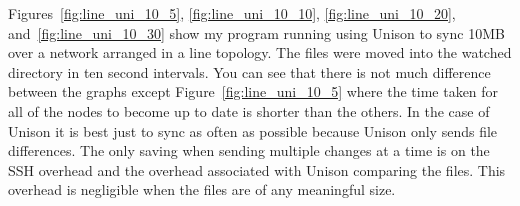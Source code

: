 \documentclass[12pt]{article}
\begin{document}

Figures~\ref{fig:line_uni_10_5},
\ref{fig:line_uni_10_10}, \ref{fig:line_uni_10_20},
and~\ref{fig:line_uni_10_30} show my program running
using Unison to sync 10MB over a network arranged in
a line topology. The files were moved into the watched
directory in ten second intervals. You can see that there is not much
difference between the graphs except Figure~\ref{fig:line_uni_10_5} 
where the time taken for all of the nodes to become up to date
is shorter than the others. In the case of Unison it
is best just to sync as often as possible because Unison
only sends file differences. The only saving when sending
multiple changes at a time is on the SSH overhead
and the overhead associated with Unison comparing the
files. This overhead is negligible when the files
are of any meaningful size.
\end{document}
